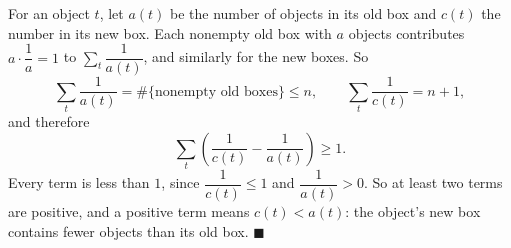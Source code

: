 For an object $t$, let $a(t)$ be the number of objects in its old box and $c(t)$ the number in its new box. Each nonempty old box with $a$ objects contributes $a\cdot\dfrac1a=1$ to $\sum_t\dfrac1{a(t)}$, and similarly for the new boxes. So
\[\sum_t\dfrac{1}{a(t)}=\#\{\text{nonempty old boxes}\}\le n,\qquad\sum_t\dfrac{1}{c(t)}=n+1,\]
and therefore
\[\sum_t\left(\dfrac1{c(t)}-\dfrac1{a(t)}\right)\ge1.\]
Every term is less than $1$, since $\dfrac1{c(t)}\le1$ and $\dfrac1{a(t)}>0$. So at least two terms are positive, and a positive term means $c(t)<a(t)$: the object's new box contains fewer objects than its old box. $\blacksquare$
